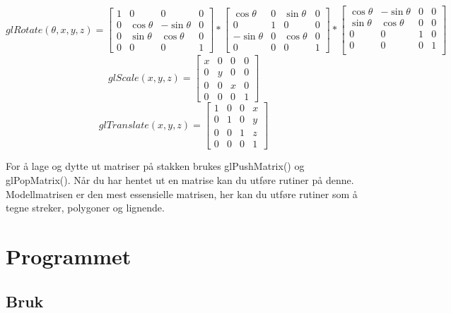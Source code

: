 \documentclass[10pt,a4paper, norsk]{article}
\begin{document}
\begin{equation}
glRotate(\theta	,x,y,z)  = \begin{bmatrix}
1 & 0&  0 &0 \\
0   &\cos \theta &  -\sin \theta &0\\
0 &  \sin \theta   & \cos \theta &0\\
0&0&0&1
\end{bmatrix} * \begin{bmatrix}
\cos \theta  & 0 &  \sin \theta &0\\
0  & 1  & 0 & 0\\
-\sin \theta &  0 &  \cos \theta  &0\\
0&0&0&1
\end{bmatrix} 
*
\begin{bmatrix}
\cos \theta & -\sin \theta &   0 &0\\[3pt]
\sin \theta & \cos \theta  & 0 &0\\[3pt]
0 &0 & 1 &0\\
0&0&0&1\\
\end{bmatrix}
\end{equation}
\begin{equation}
glScale(x,y,z)=
\begin{bmatrix}
x &0&0&0\\
0&y&0&0\\
0&0&x&0\\
0&0&0&1
\end{bmatrix}
\end{equation}
\begin{equation}
glTranslate(x,y,z)=
\begin{bmatrix}
1 &0&0&x\\
0&1&0&y\\
0&0&1&z\\
0&0&0&1
\end{bmatrix}
\end{equation}

For å lage og dytte ut matriser på stakken brukes glPushMatrix() og glPopMatrix(). Når du har hentet ut en matrise kan du utføre rutiner på denne. Modellmatrisen er den mest essensielle matrisen, her kan du utføre rutiner som å tegne streker, polygoner og lignende. 




\section*{Programmet} 

\subsection*{Bruk}
\end{document}
